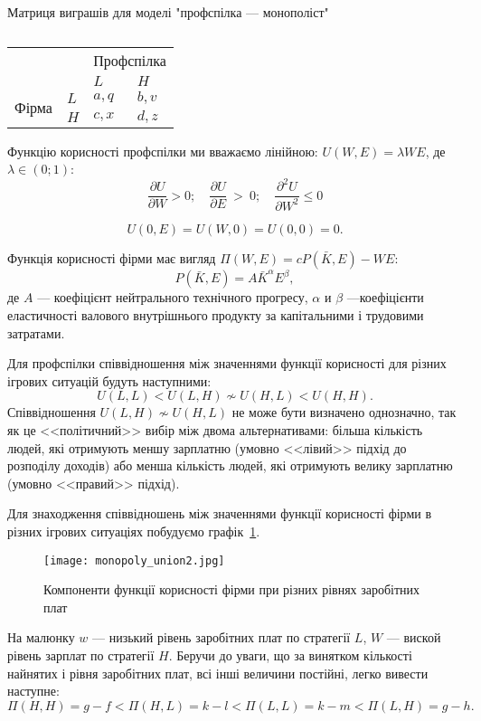 \begin{table}[h]
	\centering
	\caption{}
		Матриця виграшів для моделі "профспілка --- монополіст"\\
		\normalsize
	\begin{tabular}{|l|l|l|l|}
		\hline
		\multicolumn{2}{|l|}{\multirow{2}{*}{}} & \multicolumn{2}{l|}{Профспілка} \\ \cline{3-4} 
		\multicolumn{2}{|l|}{}                  & $L$            & $H$            \\ \hline
		\multirow{2}{*}{Фірма}     & $L$     & $a,q$          & $b,v$          \\ \cline{2-4} 
		& $H$     & $c,x$          & $d,z$          \\ \hline
	\end{tabular}
	\label{tab:mono:prof}
\end{table}
Функцію корисності профспілки ми вважаємо лінійною: $U(W,E)=\lambda WE$, де $\lambda \in(0;1)$:
$$
	\frac{\partial U}{\partial W} > 0; 
	\quad 
	\frac{\partial U}{\partial E}~>~0 ; 
	\quad
	\frac{\partial^2 U}{\partial W^2} \leqslant 0
$$

$$
	U(0,E) = U(W,0) = U(0,0) = 0.
$$

Функція корисності фірми має вигляд $\Pi(W,E)=cP(\bar{K},E)-WE$:
$$P(\bar{K}, E)=A\bar{K}^\alpha E^\beta,$$ 
де $A$ --- коефіцієнт нейтрального технічного прогресу, $\alpha$ и $\beta$
---коефіцієнти еластичності валового внутрішнього продукту за капітальними і
трудовими затратами.

Для профспілки співвідношення між значеннями функції корисності для різних ігрових ситуацій
будуть наступними:
\begin{equation}
U(L,L) < U(L,H) \nsim U(H, L) < U(H,H).
\end{equation}
Співвідношення $U(L,H) \nsim U(H, L)$ не може бути визначено однозначно, так
як це <<політичний>> вибір між двома альтернативами: більша кількість
людей, які отримують меншу зарплатню (умовно <<лівий>> підхід до розподілу
доходів) або менша кількість людей, які отримують велику зарплатню (умовно
<<правий>> підхід).

Для знаходження співвідношень між значеннями функції корисності фірми в різних ігрових ситуаціях
побудуємо графік~\ref{fig:monopoly_union1}.

\begin{figure}[h]
	\texttt{[image: monopoly\_union2.jpg]}
	\caption{Компоненти функції корисності фірми при різних рівнях заробітних плат}
	\label{fig:monopoly_union1}
\end{figure}
На малюнку $w$ --- низький рівень заробітних плат по стратегії $L$, $W$ --- виской рівень зарплат по стратегії $H$. 
Беручи до уваги, що за винятком кількості найнятих і рівня заробітних плат, всі інші величини постійні,
легко вивести наступне:
\begin{equation}
\Pi(H,H)=g-f < \Pi(H,L)=k-l < \Pi(L, L)=k-m < \Pi(L,H)=g-h.
\end{equation}

